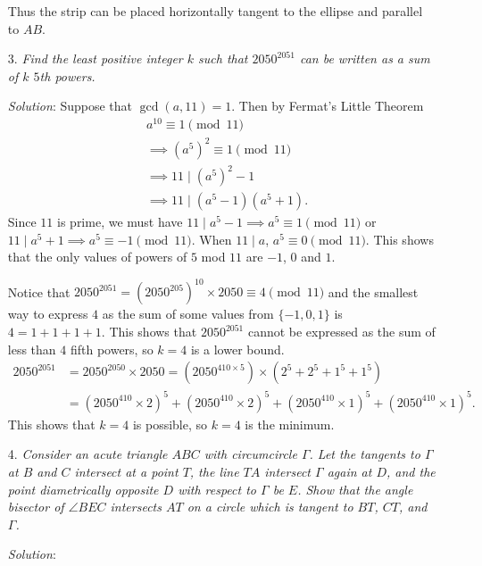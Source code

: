 \documentclass{article}
\begin{document}
\begin{enumerate}
Thus the strip can be placed horizontally tangent to the ellipse and parallel to $AB$.


\item[3.] %
{\itshape
Find the least positive integer $k$ such that $2050^{2051}$ can be written as a sum of $k$ $5$th powers.
}

\textit{Solution}:
Suppose that $\gcd(a, 11) = 1$. Then by Fermat's Little Theorem
\begin{align*}
  & a^{10} \equiv 1 \pmod{11} \\
  & \implies (a^5)^2 \equiv 1 \pmod{11} \\
  & \implies 11 \mid (a^5)^2 - 1 \\
  & \implies 11 \mid (a^5 - 1)(a^5 + 1).
\end{align*}
Since $11$ is prime, we must have $11 \mid a^5 - 1 \implies a^5 \equiv 1 \pmod{11}$ or $11 \mid a^5 + 1 \implies a^5 \equiv -1 \pmod{11}$. When $11 \mid a$, $a^5 \equiv 0 \pmod{11}$.
This shows that the only values of powers of $5$ mod $11$ are $-1$, $0$ and $1$. 

Notice that $2050^{2051} = (2050^{205})^{10} \times 2050 \equiv 4 \pmod{11}$ and the smallest way to express $4$ as the sum of some values from $\{-1, 0, 1\}$ is $4 = 1 + 1 + 1 + 1$.
This shows that $2050^{2051}$ cannot be expressed as the sum of less than $4$ fifth powers, so $k = 4$ is a lower bound.
\begin{align*}
	{2050}^{2051} & = {2050}^{2050} \times 2050 = (2050^{410 \times 5}) \times (2^5 + 2^5 + 1^5 + 1^5) \\
				  & = (2050^{410} \times 2)^5 + (2050^{410} \times 2)^5 + (2050^{410} \times 1)^5 + (2050^{410} \times 1)^5.
\end{align*}
This shows that $k = 4$ is possible, so $k = 4$ is the minimum.


\item[4.] %
{\itshape
Consider an acute triangle $ABC$ with circumcircle $\Gamma$.
Let the tangents to $\Gamma$ at $B$ and $C$ intersect at a point $T$, the line $TA$ intersect $\Gamma$ again at $D$, and the point diametrically opposite $D$ with respect to $\Gamma$ be $E$.
Show that the angle bisector of $\angle BEC$ intersects $AT$ on a circle which is tangent to $BT$, $CT$, and $\Gamma$.
}

\textit{Solution}:


\end{enumerate}
\end{document}

